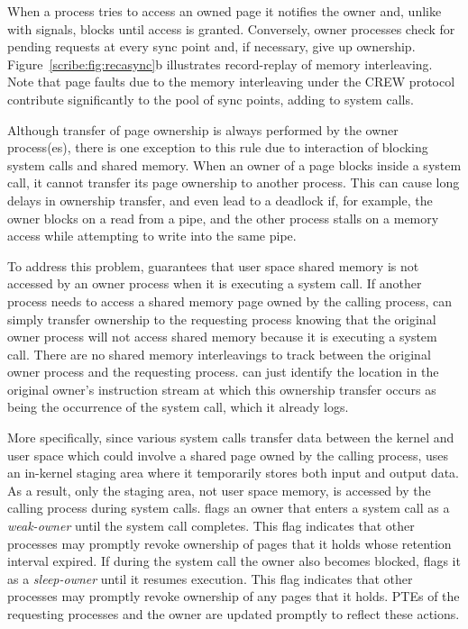When a process tries to access an owned page it notifies the owner
and, unlike with signals, blocks until access is granted.  Conversely,
owner processes check for pending requests at every sync point and, if
necessary, give up ownership. Figure~\ref{scribe:fig:recasync}b illustrates
record-replay of memory interleaving.  Note that page faults due to
the memory interleaving under the CREW protocol contribute
significantly to the pool of sync points, adding to system calls.

Although transfer of page ownership is always performed by the owner
process(es), there is one exception to this rule due to interaction of
blocking system calls and shared memory.  When an owner of a page
blocks inside a system call, it cannot transfer its page
ownership to another process.  This can cause long delays in
ownership transfer, and
even lead to a deadlock if, for
example, the owner blocks on a read from a pipe, and the other process
stalls on a memory access while attempting to write into the same
pipe.

To address this problem, \scribe{} guarantees that user space
shared memory is not accessed by an owner process when it is executing
a system call.  If another process needs to access a shared memory
page owned by the calling process, \scribe{} can simply transfer
ownership to the requesting process knowing that the original owner
process will not access shared memory because it is executing a system
call.  There are no shared memory interleavings to track between the
original owner process and the requesting process.  \scribe{} can
just identify the location in the original owner's instruction stream
at which this ownership transfer occurs as being the occurrence of the
system call, which it already logs.

More specifically, since various system calls transfer data between
the kernel and user space which could involve a shared page owned by
the calling process, \scribe{} uses an in-kernel staging area where it
temporarily stores both input and output data.  As a result, only the
staging area, not user space memory, is accessed by the calling
process during system calls.  \scribe{} flags an owner that enters a 
system call as a {\em weak-owner} until the system call completes.
This flag indicates that other processes may promptly revoke ownership
of pages that it holds whose retention interval expired. If during the
system call the owner also becomes blocked, \scribe{} flags it as a
{\em sleep-owner} until it resumes execution. This flag indicates that
other processes may promptly revoke ownership of any pages that it
holds.  PTEs of the requesting processes and the owner are updated
promptly to reflect these actions.

